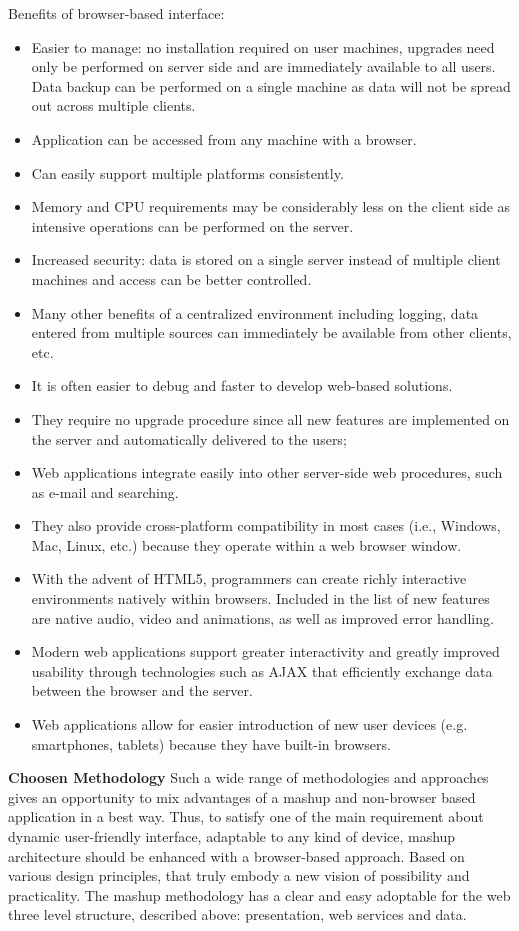 Benefits of browser-based interface:
\begin{itemize}
\item Easier to manage: no installation required on user machines, upgrades need only be performed on server side and are immediately available to all users. Data backup can be performed on a single machine as data will not be spread out across multiple clients.
\item Application can be accessed from any machine with a browser.
\item Can easily support multiple platforms consistently.
\item Memory and CPU requirements may be considerably less on the client side as intensive operations can be performed on the server.
\item Increased security: data is stored on a single server instead of multiple client machines and access can be better controlled.
\item Many other benefits of a centralized environment including logging, data entered from multiple sources can immediately be available from other clients, etc.
\item It is often easier to debug and faster to develop web-based solutions.
\item They require no upgrade procedure since all new features are implemented on the server and automatically delivered to the users;
\item Web applications integrate easily into other server-side web procedures, such as e-mail and searching.
\item They also provide cross-platform compatibility in most cases (i.e., Windows, Mac, Linux, etc.) because they operate within a web browser window.
\item With the advent of HTML5, programmers can create richly interactive environments natively within browsers. Included in the list of new features are native audio, video and animations, as well as improved error handling.
\item Modern web applications support greater interactivity and greatly improved usability through technologies such as AJAX that efficiently exchange data between the browser and the server.
\item Web applications allow for easier introduction of new user devices (e.g. smartphones, tablets) because they have built-in browsers.
\end{itemize}

\textbf{Choosen Methodology}
\newline
Such a wide range of methodologies and approaches gives an opportunity to mix advantages of a mashup and non-browser based application in a best way. Thus, to satisfy one of the main requirement about dynamic user-friendly interface, adaptable to any kind of device, mashup architecture should be enhanced with a browser-based approach. Based on various design principles, that truly embody a new vision of possibility and practicality\cite{hickson2011html5}. The mashup methodology has a clear and easy adoptable for the web three level structure, described above: presentation, web services and data. 

